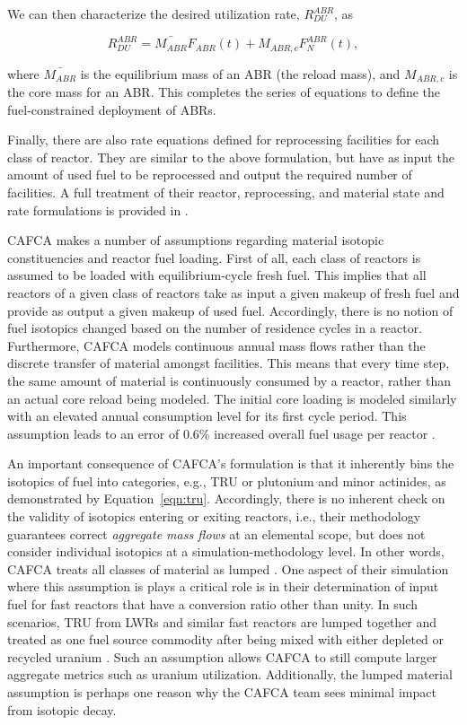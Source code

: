 We can then characterize the desired utilization rate, $R^{ABR}_{DU}$, as

\begin{equation}
 R^{ABR}_{DU} = \bar{M_{ABR}} F_{ABR}(t) + M_{ABR,c} F_N^{ABR}(t),
\end{equation}

where $\bar{M_{ABR}}$ is the equilibrium mass of an ABR (the reload mass), and
$M_{ABR,c}$ is the core mass for an ABR. This completes the series of equations
to define the fuel-constrained deployment of ABRs.

Finally, there are also rate equations defined for reprocessing facilities for
each class of reactor. They are similar to the above formulation, but have as
input the amount of used fuel to be reprocessed and output the required number
of facilities. A full treatment of their reactor, reprocessing, and material
state and rate formulations is provided in \cite{busquim_e_silva_system_2008}.

CAFCA makes a number of assumptions regarding material isotopic constituencies
and reactor fuel loading. First of all, each class of reactors is assumed to be
loaded with equilibrium-cycle fresh fuel. This implies that all reactors of a
given class of reactors take as input a given makeup of fresh fuel and provide
as output a given makeup of used fuel. Accordingly, there is no notion of fuel
isotopics changed based on the number of residence cycles in a
reactor. Furthermore, CAFCA models continuous annual mass flows rather than the
discrete transfer of material amongst facilities. This means that every time
step, the same amount of material is continuously consumed by a reactor, rather
than an actual core reload being modeled. The initial core loading is modeled
similarly with an elevated annual consumption level for its first cycle
period. This assumption leads to an error of 0.6\% increased overall fuel usage
per reactor \cite{guerin_impact_2009}.

An important consequence of CAFCA's formulation is that it inherently bins the
isotopics of fuel into categories, e.g., TRU or plutonium and minor actinides,
as demonstrated by Equation~\ref{eqn:tru}. Accordingly, there is no inherent
check on the validity of isotopics entering or exiting reactors, i.e., their
methodology guarantees correct \textit{aggregate mass flows} at an elemental
scope, but does not consider individual isotopics at a simulation-methodology
level. In other words, CAFCA treats all classes of material as
lumped \cite{guerin_impact_2009}. One aspect of their simulation where this
assumption is plays a critical role is in their determination of input fuel for
fast reactors that have a conversion ratio other than unity. In such scenarios,
TRU from LWRs and similar fast reactors are lumped together and treated as one
fuel source commodity after being mixed with either depleted or recycled
uranium \cite{guerin_impact_2009}. Such an assumption allows CAFCA to still
compute larger aggregate metrics such as uranium utilization. Additionally, the
lumped material assumption is perhaps one reason why the CAFCA team sees minimal
impact from isotopic decay.

